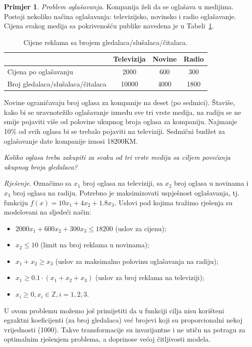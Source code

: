 \documentclass[a4paper, utf8, 11pt, colorlinks]{book}
\theoremstyle{definition}
\newtheorem{primjer}{Primjer}[chapter]
\begin{document}
\begin{primjer}
\emph{Problem oglašavanja}. Kompanija želi da se oglašava u medijima. Postoji nekoliko načina oglašavanja:  televizijsko, novinsko i radio oglašavanje. Cijena svakog medija sa pokrivenošću publike navedena je u Tabeli~\ref{tab:tab_model_advertising}.

\begin{table}[!ht]
	\centering
	\begin{tabular}{l|c|c|c} \hline
		\                  & Televizija & Novine & Radio  \\ \hline
		Cijena po oglašavanju      & 2000       & 600    & 300    \\
		Broj gledalaca/slušalaca/čitalaca      & 10000      & 4000  & 1800 \\ \hline
	\end{tabular}
	\caption{Cijene reklama sa brojem gledalaca/slušalaca/čitalaca.}
	\label{tab:tab_model_advertising}
\end{table}
  

Novine ograničavaju broj oglasa za kompanije na deset (po sedmici). Štaviše, kako bi se uravnotežilo oglašavanje između sve tri vrste medija, na radiju se ne smije pojaviti više od polovine ukupnog broja oglasa za kompaniju. Najmanje 10\% od svih oglasa bi se trebalo pojaviti na televiziji. Sedmični budžet za oglašavanje date kompanije iznosi 18200KM. 

\emph{Koliko oglasa treba zakupiti za svaku od tri vrste medija sa ciljem povećanja ukupnog broja gledalaca?}

\emph{Rješenje}.   Označimo sa $x_1$ broj oglasa na televiziji, sa $x_2$ broj oglasa u novinama i $x_3$ broj oglasa na radiju. Potrebno je maksimizovati   uspješnost oglašavanja, tj. funkciju 
$f(x) = 10 x_1 + 4 x_2 + 1.8 x_3.$ Uslovi pod kojima tražimo rješenja su modelovani na sljedeći način:
\begin{itemize}
	\item $2000 x_1 + 600 x_2 + 300 x_3 \leq 18200$ (uslov za cijenu);
	\item  $ x_2 \leq 10$ (limit na broj reklama u novinama);
	\item $x_1 + x_2 \geq x_3$ (uslov za maksimalno polovinu oglašavanja na radiju);
	\item ${x_1}\geq 0.1\cdot (x_1 + x_2 + x_3)$ (uslov za broj reklama na televiziji);
	\item $x_i \geq 0, x_i \in \mathbb{Z}, i=1,2,3$.
\end{itemize}

U ovom problemu možemo još primijetiti da u funkciji cilja   
nisu korišteni egzaktni koeficijenti (za broj gledalaca) već brojevi koji su proporcionalni nekoj vrijednosti (1000). Takve transformacije su invarijantne i ne utiču na potragu za optimalnim rješenjem  problema, a doprinose većoj čitljivosti modela.
\end{primjer}
\end{document}
